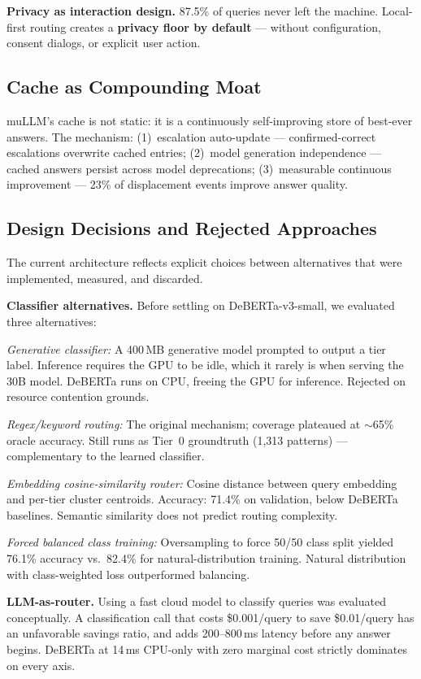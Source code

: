 \documentclass[11pt]{article}
\begin{document}
\textbf{Privacy as interaction design.} 87.5\% of queries never left the
machine. Local-first routing creates a \textbf{privacy floor by default}
--- without configuration, consent dialogs, or explicit user action.

\subsection{Cache as Compounding Moat}

muLLM's cache is not static: it is a continuously self-improving store
of best-ever answers. The mechanism: (1)~escalation auto-update ---
confirmed-correct escalations overwrite cached entries; (2)~model
generation independence --- cached answers persist across model
deprecations; (3)~measurable continuous improvement --- 23\% of
displacement events improve answer quality.

\subsection{Design Decisions and Rejected Approaches}

The current architecture reflects explicit choices between alternatives
that were implemented, measured, and discarded.

\textbf{Classifier alternatives.} Before settling on DeBERTa-v3-small,
we evaluated three alternatives:

\textit{Generative classifier:} A 400\,MB generative model prompted to
output a tier label. Inference requires the GPU to be idle, which it
rarely is when serving the 30B model. DeBERTa runs on CPU, freeing the
GPU for inference. Rejected on resource contention grounds.

\textit{Regex/keyword routing:} The original mechanism; coverage
plateaued at $\sim$65\% oracle accuracy. Still runs as Tier~0
groundtruth (1,313 patterns) --- complementary to the learned classifier.

\textit{Embedding cosine-similarity router:} Cosine distance between
query embedding and per-tier cluster centroids. Accuracy: 71.4\% on
validation, below DeBERTa baselines. Semantic similarity does not
predict routing complexity.

\textit{Forced balanced class training:} Oversampling to force 50/50
class split yielded 76.1\% accuracy vs.\ 82.4\% for natural-distribution
training. Natural distribution with class-weighted loss outperformed
balancing.

\textbf{LLM-as-router.} Using a fast cloud model to classify queries was
evaluated conceptually. A classification call that costs \$0.001/query to
save \$0.01/query has an unfavorable savings ratio, and adds 200--800\,ms
latency before any answer begins. DeBERTa at 14\,ms CPU-only with zero
marginal cost strictly dominates on every axis.
\end{document}
